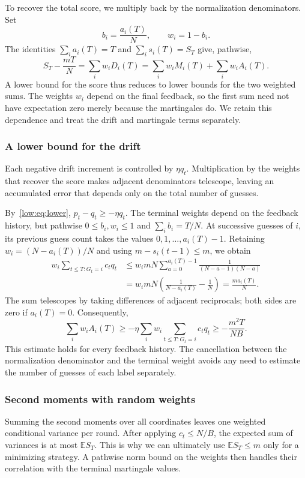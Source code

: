 \documentclass[11pt,reqno]{amsart}
\numberwithin{equation}{section}
\theoremstyle{remark}
\theoremstyle{definition}
\newcommand{\E}{\mathbb E}
\begin{document}
To recover the total score, we multiply back by the normalization denominators. Set
\[
 b_i=\frac{a_i(T)}N,\qquad w_i=1-b_i.
\]
The identities $\sum_i a_i(T)=T$ and $\sum_i s_i(T)=S_T$ give, pathwise,
\begin{equation}\label{low:eq:reconstruction}
 S_T-\frac{mT}{N}
 =\sum_i w_iD_i(T)
 =\sum_i w_iM_i(T)+\sum_i w_iA_i(T).
\end{equation}
A lower bound for the score thus reduces to lower bounds for the two weighted sums. The weights $w_i$ depend on the final feedback, so the first sum need not have expectation zero merely because the martingales do. We retain this dependence and treat the drift and martingale terms separately.

\subsubsection{A lower bound for the drift}
Each negative drift increment is controlled by $\eta q_t$. Multiplication by the weights that recover the score makes adjacent denominators telescope, leaving an accumulated error that depends only on the total number of guesses.

By~\eqref{low:eq:lower}, $p_t-q_t\ge-\eta q_t$. The terminal weights depend on the feedback history, but pathwise $0\le b_i,w_i\le1$ and $\sum_i b_i=T/N$. At successive guesses of $i$, its previous guess count takes the values $0,1,\ldots,a_i(T)-1$. Retaining $w_i=(N-a_i(T))/N$ and using $m-s_i(t-1)\le m$, we obtain
\begin{align*}
 w_i\sum_{t\le T:G_t=i}c_tq_t
 &\le w_i mN\sum_{a=0}^{a_i(T)-1}
 \frac1{(N-a-1)(N-a)}\\
 &=w_i mN\left(\frac1{N-a_i(T)}-\frac1N\right)
 =\frac{m a_i(T)}N.
\end{align*}
The sum telescopes by taking differences of adjacent reciprocals; both sides are zero if $a_i(T)=0$. Consequently,
\begin{equation}\label{low:eq:drift}
 \sum_iw_iA_i(T)
 \ge-\eta\sum_iw_i\sum_{t\le T:G_t=i}c_tq_t
 \ge-\frac{m^2T}{NB}.
\end{equation}
This estimate holds for every feedback history. The cancellation between the normalization denominator and the terminal weight avoids any need to estimate the number of guesses of each label separately.

\subsubsection{Second moments with random weights}
Summing the second moments over all coordinates leaves one weighted conditional variance per round. After applying $c_t\le N/B$, the expected sum of variances is at most $\E S_T$. This is why we can ultimately use $\E S_T\le m$ only for a minimizing strategy. A pathwise norm bound on the weights then handles their correlation with the terminal martingale values.
\end{document}
